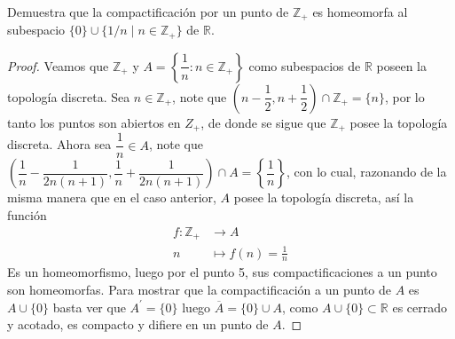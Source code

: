 
 \item Demuestra que la compactificación por un punto de $\mathbb{Z}_{+}$ es homeomorfa al subespacio $\{0\} \cup \{1 / n \mid n \in \mathbb{Z}_{+}\}$ de $\mathbb{R}$.

 \begin{proof}
Veamos que $\mathbb{Z}_{+}$ y $A=\left\{\dfrac{1}{n}: n \in \mathbb{Z}_{+}\right\}$ como subespacios de $\mathbb{R}$ poseen la topología discreta. Sea $n \in \mathbb{Z}_{+}$, note que $\left(n-\dfrac{1}{2}, n + \dfrac{1}{2}\right) \cap \mathbb{Z}_{+} = \{n\}$, por lo tanto los puntos son abiertos en ${Z}_{+}$, de donde se sigue que $\mathbb{Z}_{+}$ posee la topología discreta. Ahora sea $\dfrac{1}{n} \in A$, note que $\left(\dfrac{1}{n}-\dfrac{1}{2n(n+1)},\dfrac{1}{n}+\dfrac{1}{2n(n+1)}\right)\cap A = \left\{\dfrac{1}{n}\right\}$, con lo cual, razonando de la misma manera que en el caso anterior, $A$ posee la topología discreta, así la función
\begin{align*}
    f : \mathbb{Z}_{+}&\longrightarrow A \\
    n &\longmapsto f(n) = \frac{1}{n}
\end{align*} 
Es un homeomorfismo, luego por el punto 5, sus compactificaciones a un punto son homeomorfas. Para mostrar que la compactificación a un punto de $A$ es $A \cup \{0\}$  basta ver que $A^{\prime}=\{0\}$ luego $\overline{A}=\{0\} \cup A$, como $A \cup \{0\} \subset \mathbb{R}$ es cerrado y acotado, es compacto y difiere en un punto de $A$.  
 \end{proof}
